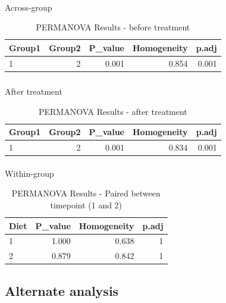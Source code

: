 \documentclass[
  letterpaper,
  DIV=11,
  numbers=noendperiod]{scrartcl}
\makeatletter
\let\oldparagraph\paragraph
\renewcommand{\paragraph}{
    \@ifstar
      \xxxParagraphStar
      \xxxParagraphNoStar
  }
\newcommand{\xxxParagraphStar}[1]{\oldparagraph*{#1}\mbox{}}
\newcommand{\xxxParagraphNoStar}[1]{\oldparagraph{#1}\mbox{}}
\let\oldsubparagraph\subparagraph
\renewcommand{\subparagraph}{
    \@ifstar
      \xxxSubParagraphStar
      \xxxSubParagraphNoStar
  }
\newcommand{\xxxSubParagraphStar}[1]{\oldsubparagraph*{#1}\mbox{}}
\newcommand{\xxxSubParagraphNoStar}[1]{\oldsubparagraph{#1}\mbox{}}
\makeatother
\begin{document}
\paragraph{Across-group}\label{across-group}

\begin{table}

\caption{PERMANOVA Results - before treatment}
\centering
\begin{tabular}[t]{lrrrr}
\toprule
\textbf{Group1} & \textbf{Group2} & \textbf{P\_value} & \textbf{Homogeneity} & \textbf{p.adj}\\
\midrule
1 & 2 & 0.001 & 0.854 & 0.001\\
\bottomrule
\end{tabular}
\end{table}

\subparagraph{After treatment}\label{after-treatment}

\begin{table}

\caption{PERMANOVA Results - after treatment}
\centering
\begin{tabular}[t]{lrrrr}
\toprule
\textbf{Group1} & \textbf{Group2} & \textbf{P\_value} & \textbf{Homogeneity} & \textbf{p.adj}\\
\midrule
1 & 2 & 0.001 & 0.834 & 0.001\\
\bottomrule
\end{tabular}
\end{table}

\paragraph{Within-group}\label{within-group}

\begin{table}

\caption{PERMANOVA Results - Paired between timepoint (1 and 2)}
\centering
\begin{tabular}[t]{lrrr}
\toprule
\textbf{Diet} & \textbf{P\_value} & \textbf{Homogeneity} & \textbf{p.adj}\\
\midrule
1 & 1.000 & 0.638 & 1\\
2 & 0.879 & 0.842 & 1\\
\bottomrule
\end{tabular}
\end{table}

\subsection{Alternate analysis}\label{alternate-analysis}
\end{document}
